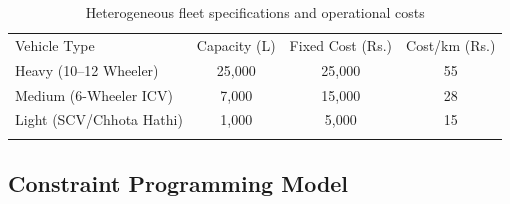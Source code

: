\documentclass{svproc}
\begin{document}
\begin{table}[t]
\caption{Heterogeneous fleet specifications and operational costs \cite{TataMotors2024,Eicher2024,Vahak2024}}
\label{tab:fleet}
\centering
\small
\begin{tabular}{lccc}
\hline\noalign{\smallskip}
Vehicle Type & Capacity (L) & Fixed Cost (Rs.) & Cost/km (Rs.) \\
\noalign{\smallskip}\hline\noalign{\smallskip}
Heavy (10--12 Wheeler)   & 25{,}000 & 25{,}000 & 55 \\
Medium (6-Wheeler ICV)   & 7{,}000  & 15{,}000 & 28 \\
Light (SCV/Chhota Hathi) & 1{,}000  & 5{,}000  & 15 \\
\noalign{\smallskip}\hline
\end{tabular}
\end{table}

\subsection{Constraint Programming Model}
\label{subsec2_3}
\end{document}
